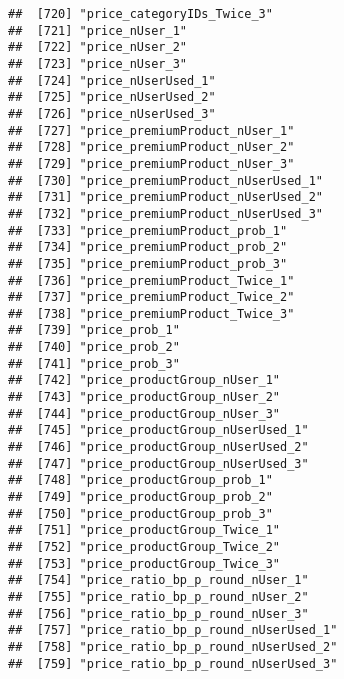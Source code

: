 \documentclass[10pt]{report}
\begin{document}
\begin{verbatim}
##  [720] "price_categoryIDs_Twice_3"                            
##  [721] "price_nUser_1"                                        
##  [722] "price_nUser_2"                                        
##  [723] "price_nUser_3"                                        
##  [724] "price_nUserUsed_1"                                    
##  [725] "price_nUserUsed_2"                                    
##  [726] "price_nUserUsed_3"                                    
##  [727] "price_premiumProduct_nUser_1"                         
##  [728] "price_premiumProduct_nUser_2"                         
##  [729] "price_premiumProduct_nUser_3"                         
##  [730] "price_premiumProduct_nUserUsed_1"                     
##  [731] "price_premiumProduct_nUserUsed_2"                     
##  [732] "price_premiumProduct_nUserUsed_3"                     
##  [733] "price_premiumProduct_prob_1"                          
##  [734] "price_premiumProduct_prob_2"                          
##  [735] "price_premiumProduct_prob_3"                          
##  [736] "price_premiumProduct_Twice_1"                         
##  [737] "price_premiumProduct_Twice_2"                         
##  [738] "price_premiumProduct_Twice_3"                         
##  [739] "price_prob_1"                                         
##  [740] "price_prob_2"                                         
##  [741] "price_prob_3"                                         
##  [742] "price_productGroup_nUser_1"                           
##  [743] "price_productGroup_nUser_2"                           
##  [744] "price_productGroup_nUser_3"                           
##  [745] "price_productGroup_nUserUsed_1"                       
##  [746] "price_productGroup_nUserUsed_2"                       
##  [747] "price_productGroup_nUserUsed_3"                       
##  [748] "price_productGroup_prob_1"                            
##  [749] "price_productGroup_prob_2"                            
##  [750] "price_productGroup_prob_3"                            
##  [751] "price_productGroup_Twice_1"                           
##  [752] "price_productGroup_Twice_2"                           
##  [753] "price_productGroup_Twice_3"                           
##  [754] "price_ratio_bp_p_round_nUser_1"                       
##  [755] "price_ratio_bp_p_round_nUser_2"                       
##  [756] "price_ratio_bp_p_round_nUser_3"                       
##  [757] "price_ratio_bp_p_round_nUserUsed_1"                   
##  [758] "price_ratio_bp_p_round_nUserUsed_2"                   
##  [759] "price_ratio_bp_p_round_nUserUsed_3"                   

\end{verbatim}
\end{document}
